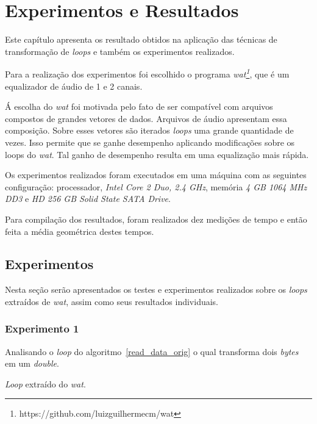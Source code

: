 \chapter{Experimentos e Resultados}

Este capítulo apresenta os resultado obtidos na aplicação das técnicas de
transformação de \textit{loops} e também
os experimentos realizados.

Para a realização dos experimentos foi escolhido o programa
\textit{wat\footnote{https://github.com/luizguilhermecm/wat}}, que é um
equalizador de áudio de 1 e 2 canais.

Á escolha do \textit{wat} foi motivada pelo fato de ser compatível com arquivos 
compostos de grandes vetores de dados. 
Arquivos de áudio apresentam essa composição. 
Sobre esses vetores são iterados \textit{loops} uma grande quantidade de vezes. 
Isso permite que se ganhe desempenho aplicando modificações sobre os loops do 
\textit{wat}. Tal ganho de desempenho resulta em uma equalização mais rápida.

Os experimentos realizados foram executados em uma máquina com as seguintes
configuração: processador, \textit{Intel Core 2 Duo, 2.4 GHz}, 
memória \textit{4 GB 1064 MHz DD3} e 
\textit{HD 256 GB Solid State SATA Drive}.

Para compilação dos resultados, foram realizados dez medições de tempo e então
feita a média geométrica destes tempos.

\section{Experimentos}

Nesta seção serão apresentados os testes e experimentos realizados sobre os
\textit{loops} extraídos de \textit{wat}, assim como seus resultados
individuais. 

\subsection{Experimento 1}
Analisando o \textit{loop} do algoritmo~\ref{read_data_orig} o qual 
transforma dois \textit{bytes} em um \textit{double}.

\begin{algorithm}[H]
  \caption{\textit{Loop} extraído do \textit{wat}.}
    \label{read_data_orig}

\end{algorithm}


